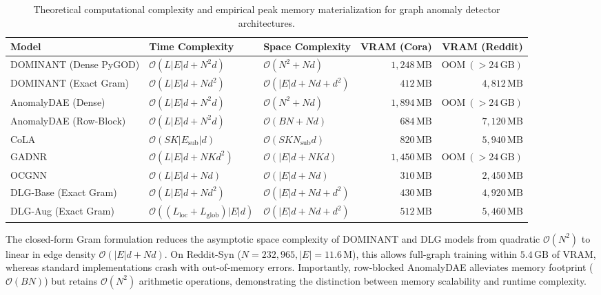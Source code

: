 \documentclass[applsci,article,submit,moreauthors,pdftex]{Definitions/mdpi}
\begin{document}
\begin{table}[htbp]
\centering\footnotesize\setlength{\tabcolsep}{3pt}
\caption{Theoretical computational complexity and empirical peak memory materialization for graph anomaly detector architectures.}
\label{tab:complexity_comparison}
\begin{tabularx}{\textwidth}{lXXrr}\toprule
\textbf{Model} & \textbf{Time Complexity} & \textbf{Space Complexity} & \textbf{VRAM (Cora)} & \textbf{VRAM (Reddit)} \\\midrule
DOMINANT (Dense PyGOD) & $\mathcal{O}(L |E| d + N^2 d)$ & $\mathcal{O}(N^2 + N d)$ & $1,248\,\mathrm{MB}$ & $\mathrm{OOM}\ (>24\,\mathrm{GB})$ \\
DOMINANT (Exact Gram) & $\mathcal{O}(L |E| d + N d^2)$ & $\mathcal{O}(|E| d + N d + d^2)$ & $412\,\mathrm{MB}$ & $4,812\,\mathrm{MB}$ \\
AnomalyDAE (Dense) & $\mathcal{O}(L |E| d + N^2 d)$ & $\mathcal{O}(N^2 + N d)$ & $1,894\,\mathrm{MB}$ & $\mathrm{OOM}\ (>24\,\mathrm{GB})$ \\
AnomalyDAE (Row-Block) & $\mathcal{O}(L |E| d + N^2 d)$ & $\mathcal{O}(B N + N d)$ & $684\,\mathrm{MB}$ & $7,120\,\mathrm{MB}$ \\
CoLA & $\mathcal{O}(S K |E_{\mathrm{sub}}| d)$ & $\mathcal{O}(S K N_{\mathrm{sub}} d)$ & $820\,\mathrm{MB}$ & $5,940\,\mathrm{MB}$ \\
GADNR & $\mathcal{O}(L |E| d + N K d^2)$ & $\mathcal{O}(|E| d + N K d)$ & $1,450\,\mathrm{MB}$ & $\mathrm{OOM}\ (>24\,\mathrm{GB})$ \\
OCGNN & $\mathcal{O}(L |E| d + N d)$ & $\mathcal{O}(|E| d + N d)$ & $310\,\mathrm{MB}$ & $2,450\,\mathrm{MB}$ \\
DLG-Base (Exact Gram) & $\mathcal{O}(L |E| d + N d^2)$ & $\mathcal{O}(|E| d + N d + d^2)$ & $430\,\mathrm{MB}$ & $4,920\,\mathrm{MB}$ \\
DLG-Aug (Exact Gram) & $\mathcal{O}((L_{\mathrm{loc}} + L_{\mathrm{glob}}) |E| d)$ & $\mathcal{O}(|E| d + N d + d^2)$ & $512\,\mathrm{MB}$ & $5,460\,\mathrm{MB}$ \\\bottomrule
\end{tabularx}
\end{table}

The closed-form Gram formulation reduces the asymptotic space complexity of DOMINANT and DLG models from quadratic $\mathcal{O}(N^2)$ to linear in edge density $\mathcal{O}(|E| d + N d)$. On Reddit-Syn ($N=232,965, |E|=11.6\,\mathrm{M}$), this allows full-graph training within $5.4\,\mathrm{GB}$ of VRAM, whereas standard implementations crash with out-of-memory errors. Importantly, row-blocked AnomalyDAE alleviates memory footprint ($\mathcal{O}(B N)$) but retains $\mathcal{O}(N^2)$ arithmetic operations, demonstrating the distinction between memory scalability and runtime complexity.
\end{document}
